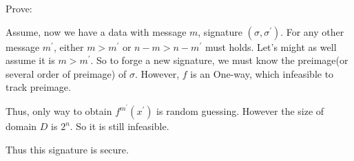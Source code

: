 \normalfont\documentclass[letterpaper,11pt]{article}
\begin{document}
\begin{enumerate}
\begin{enumerate}
	Prove:\par
	Assume, now we have a data with message $m$, signature $(\sigma, \sigma^\prime)$. For any other message $m^\prime$, either $m > m^\prime$ or $n - m > n - m ^\prime$ must holds. Let's might as well assume it is $m > m^\prime$. So to forge a new signature, we must know the preimage(or several order of preimage) of $\sigma$. However, $f$ is an One-way, which infeasible to track preimage.\par
	Thus, only way to obtain $f^{m^\prime}(x^\prime)$ is random guessing. However the size of domain $D$ is $2^{n}$. So it is still infeasible.\par
	Thus this signature is secure.
	\end{enumerate}
\end{enumerate}
\end{document}
